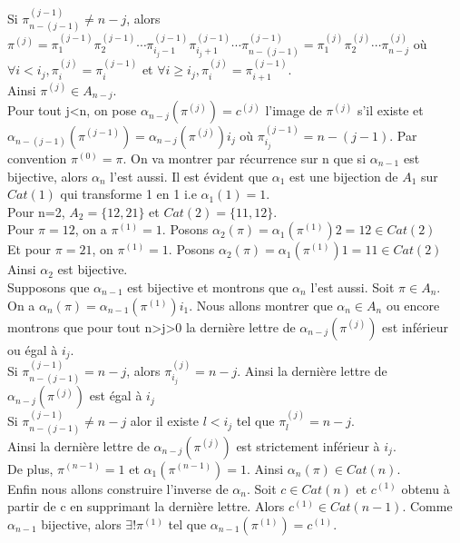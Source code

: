 			Si $\pi_{n-(j-1)}^{(j-1)} \neq n-j $, alors $\pi^{(j)} = \pi_{1}^{(j-1)}\pi_{2}^{(j-1)} \cdots \pi_{i_{j}-1}^{(j-1)} \pi_{i_{j}+1}^{(j-1)} \cdots \pi_{n-(j-1)}^{(j-1)} = \pi_{1}^{(j)}\pi_{2}^{(j)} \cdots \pi_{n-j}^{(j)} $ où $\forall i<i_{j}, \pi_{i}^{(j)}=\pi_{i}^{(j-1)}$ et $\forall i\geq i_{j},\pi_{i}^{(j)}=\pi_{i+1}^{(j-1)}$.\\
			Ainsi $\pi^{(j)} \in A_{n-j}$.\\
			Pour tout j<n, on pose $\alpha_{n-j}(\pi^{(j)})=c^{(j)}$ l'image de $\pi^{(j)}$ s'il existe et\\
			$\alpha_{n-(j-1)}(\pi^{(j-1)})=\alpha_{n-j}(\pi^{(j)})i_{j}$ où $\pi_{i_{j}}^{(j-1)} = n-(j-1)$. Par convention $\pi^{(0)}=\pi$. On va montrer par récurrence sur n que si $\alpha_{n-1}$ est bijective, alors $\alpha_{n}$ l'est aussi. Il est évident que $\alpha_{1}$ est une bijection de $A_{1}$ sur $Cat(1)$ qui transforme 1 en 1 i.e $\alpha_{1}(1)=1$.\\
			Pour n=2, $A_{2} = \{12, 21\} $ et $Cat(2)=\{11, 12\}$.\\
			Pour $\pi=12$, on a $\pi^{(1)}=1$. Posons $\alpha_{2}(\pi) = \alpha_{1}(\pi^{(1)})2 = 12 \in Cat(2) $\\
			Et pour $\pi=21$, on $\pi^{(1)}=1$. Posons $\alpha_{2}(\pi) = \alpha_{1}(\pi^{(1)})1 = 11 \in Cat(2)$\\
			Ainsi $\alpha_{2}$ est bijective.\\
			Supposons que $\alpha_{n-1}$ est bijective et montrons que $\alpha_{n}$ l'est aussi. Soit $\pi \in A_{n}$.\\
			On a $\alpha_{n}(\pi) = \alpha_{n-1}(\pi^{(1)})i_{1} $. Nous allons montrer que $\alpha_{n}\in A_{n}$ ou encore montrons que pour tout n>j>0 la dernière lettre de $\alpha_{n-j}(\pi^{(j)})$ est inférieur ou égal à $i_{j}$.\\
			Si $\pi_{n-(j-1)}^{(j-1)} = n-j $, alors $\pi_{i_{j}}^{(j)}= n-j $. Ainsi la dernière lettre de $\alpha_{n-j}(\pi^{(j)})$ est égal à $i_{j}$\\
			Si $\pi_{n-(j-1)}^{(j-1)} \neq n-j $ alor il existe $l<i_{j}$ tel que $\pi_{l}^{(j)} = n-j $.\\
			Ainsi la dernière lettre de $\alpha_{n-j}(\pi^{(j)})$ est strictement inférieur à $i_{j}$.\\
			De plus, $\pi^{(n-1)}=1$ et $\alpha_{1}(\pi^{(n-1)})=1$. Ainsi $\alpha_{n}(\pi) \in Cat(n)$.\\
			Enfin nous allons construire l'inverse de $\alpha_{n}$. Soit $c \in Cat(n)$ et $c^{(1)}$ obtenu à partir de c en supprimant la dernière lettre. Alors $c^{(1)} \in Cat(n-1) $. Comme $\alpha_{n-1}$ bijective, alors $\exists ! \pi^{(1)}$ tel que $\alpha_{n-1}(\pi^{(1)}) = c^{(1)} $.\\
